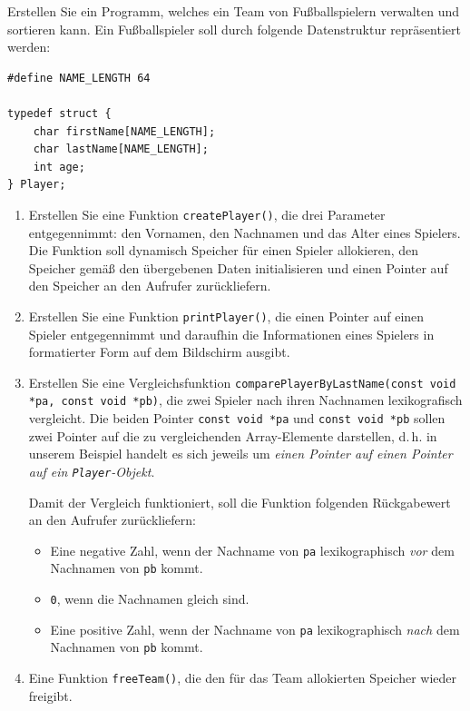\vspace{10pt}

Erstellen Sie ein Programm, welches ein Team von Fußballspielern verwalten und
sortieren kann. Ein Fußballspieler soll durch folgende Datenstruktur
repräsentiert werden:

\begin{verbatim}
#define NAME_LENGTH 64

typedef struct {
    char firstName[NAME_LENGTH];
    char lastName[NAME_LENGTH];
    int age;
} Player;
\end{verbatim}

\begin{enumerate}
  \item Erstellen Sie eine Funktion \texttt{createPlayer()}, die drei
  Parameter entgegennimmt: den Vornamen, den Nachnamen und das Alter eines
  Spielers. Die Funktion soll dynamisch Speicher für einen Spieler allokieren,
  den Speicher gemäß den übergebenen Daten initialisieren und einen Pointer auf
  den Speicher an den Aufrufer zurückliefern.
  \item Erstellen Sie eine Funktion \texttt{printPlayer()}, die einen
  Pointer auf einen Spieler entgegennimmt und daraufhin die Informationen eines
  Spielers in formatierter Form auf dem Bildschirm ausgibt.
  \item Erstellen Sie eine Vergleichsfunktion
  \texttt{comparePlayerByLastName(const void *pa, const void *pb)}, die
  zwei Spieler nach ihren Nachnamen lexikografisch vergleicht. Die beiden
  Pointer \texttt{const void *pa} und \texttt{const void *pb}
  sollen zwei Pointer auf die zu vergleichenden Array-Elemente darstellen,
  d.\,h. in unserem Beispiel handelt es sich jeweils um \textit{einen Pointer
  auf einen Pointer auf ein \texttt{Player}-Objekt}.

  Damit der Vergleich funktioniert, soll die Funktion folgenden Rückgabewert an
  den Aufrufer zurückliefern:
  \begin{itemize}
    \item Eine negative Zahl, wenn der Nachname von \texttt{pa}
    lexikographisch \textit{vor} dem Nachnamen von \texttt{pb} kommt.
    \item \texttt{0}, wenn die Nachnamen gleich sind.
    \item Eine positive Zahl, wenn der Nachname von \texttt{pa}
    lexikographisch \textit{nach} dem Nachnamen von \texttt{pb} kommt.
  \end{itemize}
  \item Eine Funktion \texttt{freeTeam()}, die den für das Team
  allokierten Speicher wieder freigibt.
\end{enumerate}

